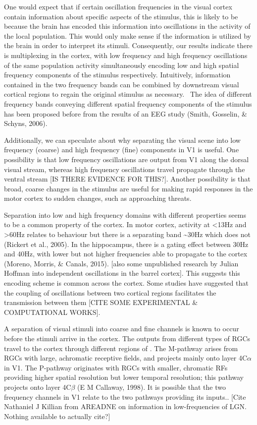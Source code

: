 One would expect that if certain oscillation frequencies in the visual cortex contain information about specific aspects of the stimulus, this is likely to be because the brain has encoded this information into oscillations in the activity of the local population. This would only make sense if the information is utilized by the brain in order to interpret its stimuli. Consequently, our results indicate there is multiplexing in the cortex, with low frequency and high frequency oscillations of the same population activity simultaneously encoding low and high spatial frequency components of the stimulus respectively. Intuitively, information contained in the two frequency bands can be combined by downstream visual cortical regions to regain the original stimulus as necessary. \ The idea of different frequency bands conveying different spatial frequency components of the stimulus has been proposed before from the results of an \ac{EEG} study (Smith, Gosselin, \& Schyns, 2006).

Additionally, we can speculate about why separating the visual scene into low frequency (coarse) and high frequency (fine) components in \ac{V1} is useful. One possibility is that low frequency oscillations are output from \ac{V1} along the dorsal visual stream, whereas high frequency oscillations travel propagate through the ventral stream [IS THERE EVIDENCE FOR THIS?]. Another possibility is that broad, coarse changes in the stimulus are useful for making rapid responses in the motor cortex to sudden changes, such as approaching threats.

Separation into low and high frequency domains with different properties seems to be a common property of the cortex. In motor cortex, activity at {\textless}13Hz and {\textgreater}60Hz relates to behaviour but there is a separating band \~{}30Hz which does not (Rickert et al., 2005). In the hippocampus, there is a gating effect between 30Hz and 40Hz, with lower but not higher frequencies able to propagate to the cortex (Moreno, Morris, \& Canals, 2015). [also some unpublished research by Julian Hoffman into independent oscillations in the barrel cortex]. This suggests this encoding scheme is common across the cortex. Some studies have suggested that the coupling of oscillations between two cortical regions facilitates the transmission between them [CITE SOME EXPERIMENTAL \& COMPUTATIONAL WORKS].

A separation of visual stimuli into coarse and fine channels is known to occur before the stimuli arrive in the cortex. The outputs from different types of \acp{RGC} travel to the cortex through different regions of . The M-pathway arises from \acp{RGC} with large, achromatic receptive fields, and projects mainly onto layer 4C$\alpha$ in \ac{V1}. The P-pathway originates with \acp{RGC} with smaller, chromatic \acp{RF} providing higher spatial resolution but lower temporal resolution; this pathway projects onto layer 4C$\beta$ (E M Callaway, 1998). It is possible that the two frequency channels in \ac{V1} relate to the two pathways providing its inputs.. [Cite Nathaniel J Killian from AREADNE on information in low-frequencies of \ac{LGN}. Nothing available to actually cite?]

